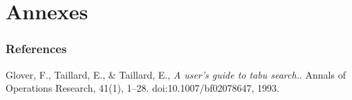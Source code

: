 \part*{Annexes}

\stopcontents

\startcontents[sections]

\setcounter{section}{0}

\newpage

\section{References}

\begin{thebibliography}{999}

  Glover, F., Taillard, E., \& Taillard, E.,
  \emph{A user’s guide to tabu search.}.
  Annals of Operations Research, 41(1), 1–28. doi:10.1007/bf02078647,
  1993.

\end{thebibliography}

\noindent
  \begin{minipage}[c]{\textwidth}
    \centering
  \end{minipage}

